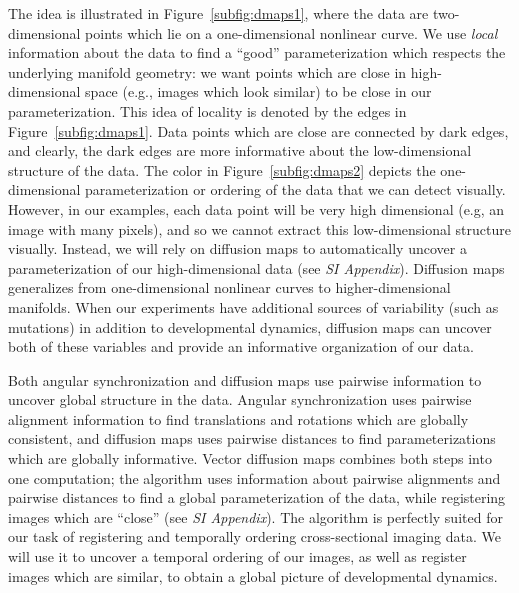 \documentclass{pnastwo}
\begin{document}
\begin{article}
The idea is illustrated in Figure~\ref{subfig:dmaps1}, where the data are two-dimensional points which lie on a one-dimensional nonlinear curve. 
%
We use {\it local} information about the data to find a ``good'' parameterization which respects the underlying manifold geometry: we want points which are close in high-dimensional space (e.g., images which look similar) to be close in our parameterization.
%
This idea of locality is denoted by the edges in Figure~\ref{subfig:dmaps1}.
%
Data points which are close are connected by dark edges, and clearly, the dark edges are more informative about the low-dimensional structure of the data. 
%
The color in Figure~\ref{subfig:dmaps2} depicts the one-dimensional parameterization or ordering of the data that we can detect visually.
%
However, in our examples, each data point will be very high dimensional (e.g, an image with many pixels), and so we cannot extract this low-dimensional structure visually.
%
Instead, we will rely on diffusion maps to automatically uncover a parameterization of our high-dimensional data (see {\it SI Appendix}).
%
Diffusion maps generalizes from one-dimensional nonlinear curves to higher-dimensional manifolds. 
%
When our experiments have additional sources of variability (such as mutations) in addition to developmental dynamics, diffusion maps can uncover both of these variables and provide an informative organization of our data. %

Both angular synchronization and diffusion maps use pairwise information to uncover global structure in the data.
%
Angular synchronization uses pairwise alignment information to find translations and rotations which are globally consistent, and diffusion maps uses pairwise distances to find parameterizations which are globally informative.
%
Vector diffusion maps combines both steps into one computation;
the algorithm uses information about pairwise alignments and pairwise distances to find a global parameterization of the data, while registering images which are ``close'' (see {\it SI Appendix}).
%
The algorithm is perfectly suited for our task of registering and temporally ordering cross-sectional imaging data.
%
We will use it to uncover a temporal ordering of our images, as well as register images which are similar, to obtain a global picture of developmental dynamics.


\end{article}
\end{document}
